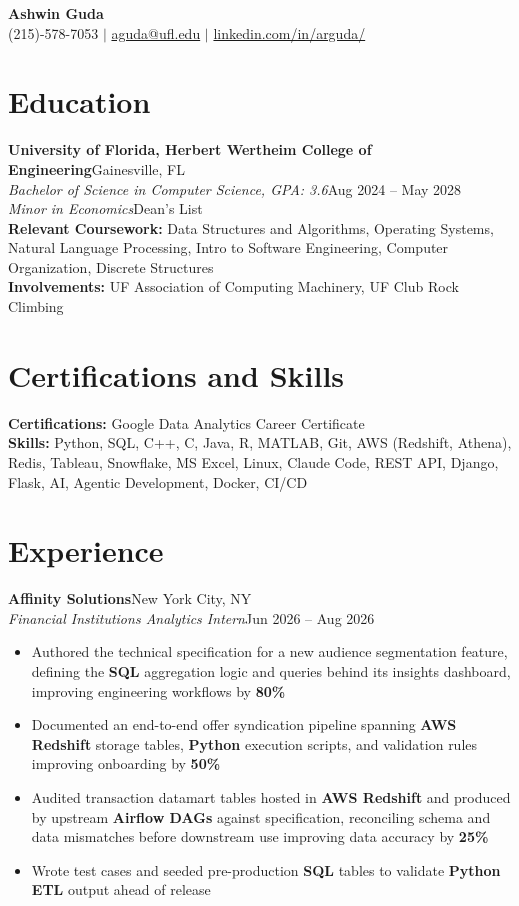 \documentclass[letterpaper,10pt]{article}
\newcommand{\headerrow}[2]{#1\hfill #2\\}
\newcommand{\entry}[4]{%
  \headerrow{\textbf{#1}}{#2}%
  \headerrow{\textit{#3}}{#4}%
}
\newenvironment{bullets}
  {\begin{itemize}[leftmargin=*,labelsep=0.5em,topsep=1pt,itemsep=0pt,parsep=0pt]}
  {\end{itemize}\vspace{1pt}}
\begin{document}
\begin{center}
  {\LARGE\bfseries Ashwin Guda}\\[3pt]
  (215)-578-7053 $|$ \href{mailto:aguda@ufl.edu}{aguda@ufl.edu} $|$
  \href{https://linkedin.com/in/arguda/}{linkedin.com/in/arguda/}
\end{center}

\section{Education}

\headerrow{\textbf{University of Florida, Herbert Wertheim College of Engineering}}{Gainesville, FL}
\headerrow{\textit{Bachelor of Science in Computer Science, GPA: 3.6}}{Aug 2024 -- May 2028}
\textit{Minor in Economics}\hfill Dean's List\\[3pt]
\textbf{Relevant Coursework:} Data Structures and Algorithms, Operating Systems, Natural Language Processing, Intro to Software Engineering, Computer Organization, Discrete Structures\\
\textbf{Involvements:} UF Association of Computing Machinery, UF Club Rock Climbing

\section{Certifications and Skills}

\textbf{Certifications:} Google Data Analytics Career Certificate \\
\textbf{Skills:} Python, SQL, C++, C, Java, R, MATLAB, Git, AWS (Redshift, Athena), Redis, Tableau, Snowflake, MS Excel, Linux, Claude Code, REST API, Django, Flask, AI, Agentic Development, Docker, CI/CD

\section{Experience}

\entry{Affinity Solutions}{New York City, NY}
      {Financial Institutions Analytics Intern}{Jun 2026 -- Aug 2026}
\begin{bullets}
  \item Authored the technical specification for a new audience segmentation feature, defining the \textbf{SQL} aggregation logic and queries behind its insights dashboard, improving engineering workflows by \textbf{80\%}
  \item Documented an end-to-end offer syndication pipeline spanning \textbf{AWS Redshift} storage tables, \textbf{Python} execution scripts, and validation rules improving onboarding by \textbf{50\%}
  \item Audited transaction datamart tables hosted in \textbf{AWS Redshift} and produced by upstream \textbf{Airflow DAGs} against specification, reconciling schema and data mismatches before downstream use improving data accuracy by \textbf{25\%}
  \item Wrote test cases and seeded pre-production \textbf{SQL} tables to validate \textbf{Python ETL} output ahead of release
\end{bullets}
\end{document}
